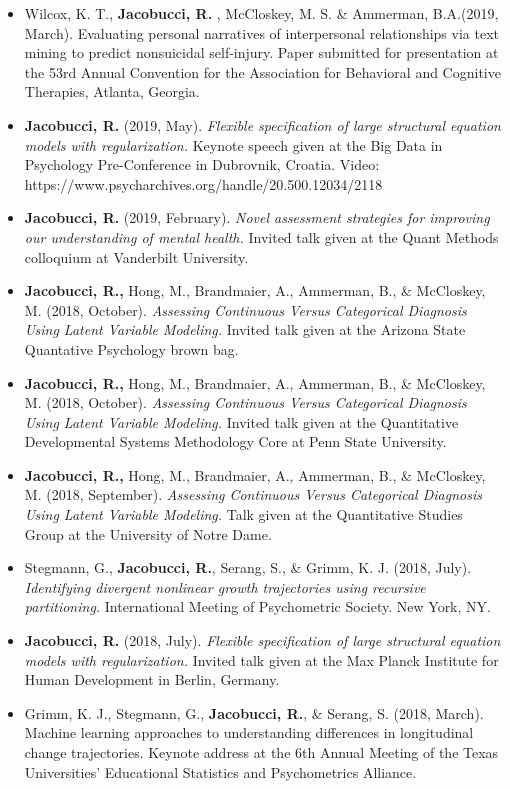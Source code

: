 \documentclass[letterpaper,10pt]{article}
\begin{document}
\begin{itemize}
\item[] Wilcox, K. T., \textbf{Jacobucci, R.} , McCloskey, M. S. \& Ammerman, B.A.(2019, March). Evaluating personal narratives of interpersonal relationships via text mining to predict nonsuicidal self-injury. Paper submitted for presentation at the 53rd Annual Convention for the Association for Behavioral and Cognitive Therapies, Atlanta, Georgia.
%
\item[]\textbf{Jacobucci, R.} (2019, May). \emph{Flexible specification of large structural equation models with regularization.} Keynote speech given at the Big Data in Psychology Pre-Conference in Dubrovnik, Croatia. Video: https://www.psycharchives.org/handle/20.500.12034/2118
%
\item[]\textbf{Jacobucci, R.} (2019, February). \emph{Novel assessment strategies for improving our understanding of mental health.} Invited talk given at the Quant Methods colloquium at Vanderbilt University.
%
\item[]\textbf{Jacobucci, R.,} Hong, M., Brandmaier, A., Ammerman, B., \& McCloskey, M. (2018, October). \emph{Assessing Continuous Versus Categorical Diagnosis Using Latent Variable Modeling.} Invited talk given at the Arizona State Quantative Psychology brown bag.
%
\item[]\textbf{Jacobucci, R.,} Hong, M., Brandmaier, A., Ammerman, B., \& McCloskey, M. (2018, October). \emph{Assessing Continuous Versus Categorical Diagnosis Using Latent Variable Modeling.} Invited talk given at the Quantitative Developmental Systems Methodology Core at Penn State University.
%
\item[]\textbf{Jacobucci, R.,} Hong, M., Brandmaier, A., Ammerman, B., \& McCloskey, M. (2018, September). \emph{Assessing Continuous Versus Categorical Diagnosis Using Latent Variable Modeling.} Talk given at the Quantitative Studies Group at the University of Notre Dame.
%
\item[]Stegmann, G., \textbf{Jacobucci, R.}, Serang, S., \& Grimm, K. J. (2018, July). \emph{Identifying divergent nonlinear growth trajectories using recursive partitioning.} International Meeting of Psychometric Society. New York, NY.
%
\item[]\textbf{Jacobucci, R.} (2018, July). \emph{Flexible specification of large structural equation models with regularization.} Invited talk given at the Max Planck Institute for Human Development in Berlin, Germany.
%
\item[]Grimm, K. J., Stegmann, G., \textbf{Jacobucci, R.}, \& Serang, S. (2018, March). Machine learning approaches to understanding differences in longitudinal change trajectories. Keynote address at the 6th Annual Meeting of the Texas Universities' Educational Statistics and Psychometrics Alliance.

\end{itemize}
\end{document}
